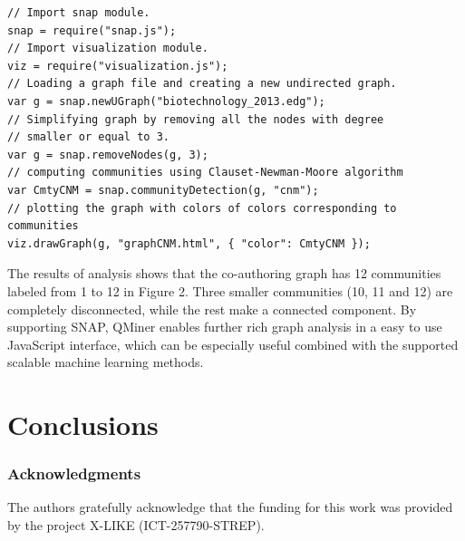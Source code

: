 \documentclass{article} %
\begin{document}
\begin{lstlisting}[caption=Graph analysis] 
// Import snap module.
snap = require("snap.js");
// Import visualization module.
viz = require("visualization.js");
// Loading a graph file and creating a new undirected graph.
var g = snap.newUGraph("biotechnology_2013.edg");
// Simplifying graph by removing all the nodes with degree 
// smaller or equal to 3.
var g = snap.removeNodes(g, 3);
// computing communities using Clauset-Newman-Moore algorithm
var CmtyCNM = snap.communityDetection(g, "cnm");
// plotting the graph with colors of colors corresponding to communities
viz.drawGraph(g, "graphCNM.html", { "color": CmtyCNM });
\end{lstlisting}
The results of analysis shows that the co-authoring graph has 12 communities labeled from 1 to 12 in Figure 2. Three smaller communities (10, 11 and 12) are completely disconnected, while the rest make a connected component. By supporting SNAP, QMiner enables further rich graph analysis in a easy to use JavaScript interface, which can be especially useful combined with the supported scalable machine learning methods.


\section{Conclusions}



\subsubsection*{Acknowledgments}
The authors gratefully acknowledge that the funding for this work was provided by the project X-LIKE (ICT-257790-STREP)\cite{xlike}.





\end{document}
